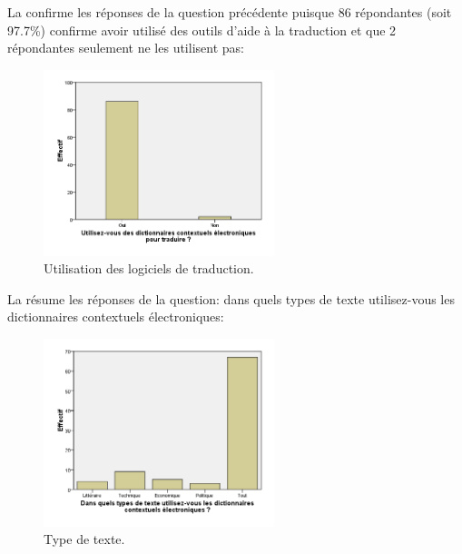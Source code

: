 \documentclass{textolivre}
\begin{document}
La  confirme les réponses de la question précédente puisque 86 répondantes (soit 97.7\%) confirme avoir utilisé des outils d’aide à la traduction et que 2 répondantes seulement ne les utilisent pas:
\begin{figure}[htbp]
\centering
\includegraphics[width=0.6\textwidth]{fig03.png}
\caption{Utilisation des logiciels de traduction.}
\label{fig03}
\end{figure}

La  résume les réponses de la question: dans quels types de texte utilisez-vous les dictionnaires contextuels électroniques:
\begin{figure}[htbp]
\centering
\includegraphics[width=0.6\textwidth]{fig04.png}
\caption{Type de texte.}
\label{fig04}
\end{figure}
\end{document}
